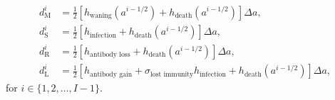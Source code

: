 \documentclass{article}
\begin{document}
\begin{subequations}
  \begin{align}
    d_{\mathrm{M}}^i
    &= \frac{1}{2} \left[h_{\text{waning}}(a^{i - 1 / 2})
      + h_{\text{death}}(a^{i - 1 / 2})\right]
      \Delta a,
    \\
    d_{\mathrm{S}}^i
    &= \frac{1}{2} \left[h_{\text{infection}}
      + h_{\text{death}}(a^{i - 1 / 2})\right]
      \Delta a,
    \\
    d_{\mathrm{R}}^i
    &= \frac{1}{2} \left[h_{\text{antibody loss}}
      + h_{\text{death}}(a^{i - 1 / 2})\right]
      \Delta a,
    \\
    d_{\mathrm{L}}^i
    &= \frac{1}{2} \left[h_{\text{antibody gain}}
      + \sigma_{\text{lost immunity}} h_{\text{infection}}
      + h_{\text{death}}(a^{i - 1 / 2})\right]
      \Delta a,
  \end{align}
\end{subequations}
for $i \in \{1, 2, \ldots, I - 1\}$.
\end{document}
